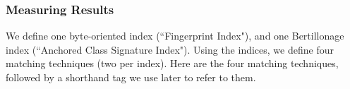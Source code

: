 





\subsubsection{Measuring Results}

We define one byte-oriented index (``Fingerprint Index"), and one
Bertillonage index (``Anchored Class Signature Index").  Using the indices,
we define four matching techniques (two per index).  Here are the four
matching techniques, followed by a shorthand tag we use later to refer to
them.

